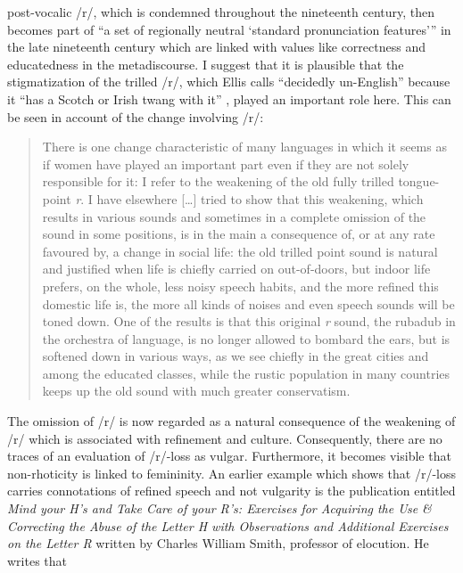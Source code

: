 post-vocalic /r/, which is condemned throughout the nineteenth century, then becomes part of “a set of regionally neutral ‘standard pronunciation features’” \citep[4]{Mugglestone2003} in the late nineteenth century which are linked with values like correctness and educatedness in the metadiscourse. I suggest that it is plausible that the stigmatization of the trilled /r/, which Ellis calls “decidedly un-English” because it “has a Scotch or Irish twang with it” \citep[603]{Ellis1869}, played an important role here. This can be seen in  account of the change involving /r/:

\begin{quote}
There is one change characteristic of many languages in which it seems as if women have played an important part even if they are not solely responsible for it: I refer to the weakening of the old fully trilled tongue-point \emph{r}. I have elsewhere […] tried to show that this weakening, which results in various sounds and sometimes in a complete omission of the sound in some positions, is in the main a consequence of, or at any rate favoured by, a change in social life: the old trilled point sound is natural and justified when life is chiefly carried on out-of-doors, but indoor life prefers, on the whole, less noisy speech habits, and the more refined this domestic life is, the more all kinds of noises and even speech sounds will be toned down. One of the results is that this original \emph{r} sound, the rubadub in the orchestra of language, is no longer allowed to bombard the ears, but is softened down in various ways, as we see chiefly in the great cities and among the educated classes, while the rustic population in many countries keeps up the old sound with much greater conservatism.
\end{quote}

The omission of /r/ is now regarded as a natural consequence of the weakening of /r/ which is associated with refinement and culture. Consequently, there are no traces of an evaluation of /r/-loss as vulgar. Furthermore, it becomes visible that non-rhoticity is linked to femininity. An earlier example which shows that /r/-loss carries connotations of refined speech and not vulgarity is the \citeyear{Smith1866} publication entitled \emph{Mind your H’s and Take Care of your R’s: Exercises for Acquiring the Use \& Correcting the Abuse of the Letter H with Observations and Additional Exercises on the Letter R} written by Charles William Smith, professor of elocution. He writes that

